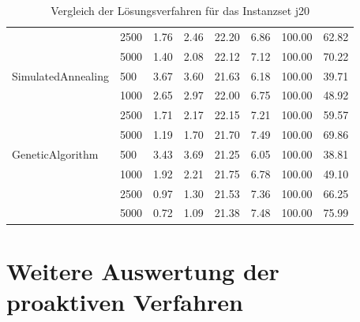 \begin{table}[H]
{\begin{tabular}{ll|rr|rr|rr}
                 & 2500 &     1.76 & 2.46 &      22.20 & 6.86 &   100.00 &   62.82 \\
                 & 5000 &     1.40 & 2.08 &      22.12 & 7.12 &   100.00 &   70.22 \\ \hline
SimulatedAnnealing & 500  &     3.67 & 3.60 &      21.63 & 6.18 &   100.00 &   39.71 \\
                 & 1000 &     2.65 & 2.97 &      22.00 & 6.75 &   100.00 &   48.92 \\
                 & 2500 &     1.71 & 2.17 &      22.15 & 7.21 &   100.00 &   59.57 \\
                 & 5000 &     1.19 & 1.70 &      21.70 & 7.49 &   100.00 &   69.86 \\ \hline
GeneticAlgorithm & 500  &     3.43 & 3.69 &      21.25 & 6.05 &   100.00 &   38.81 \\
                 & 1000 &     1.92 & 2.21 &      21.75 & 6.78 &   100.00 &   49.10 \\
                 & 2500 &     0.97 & 1.30 &      21.53 & 7.36 &   100.00 &   66.25 \\
                 & 5000 &     0.72 & 1.09 &      21.38 & 7.48 &   100.00 &   75.99 \\
\bottomrule
\end{tabular}
}
\caption{Vergleich der Lösungsverfahren für das Instanzset j20}
\label{tab:evaluation_solver_j20}
\end{table}

\newpage

\section{Weitere Auswertung der proaktiven Verfahren}
\label{sec:WeitereAuswertung_Proaktiv}

